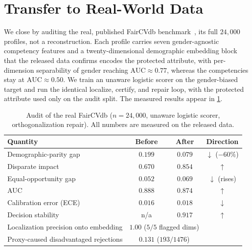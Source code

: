 \documentclass[sn-mathphys-num]{sn-jnl}
\begin{document}
\section{Transfer to Real-World Data}
\label{sec:transfer}
We close by auditing the real, published FairCVdb
benchmark~\cite{pena2020faircv,pena2023human}, its full $24{,}000$ profiles, not a
reconstruction. Each profile carries seven gender-agnostic competency features
and a twenty-dimensional demographic embedding block that the released data
confirms encodes the protected attribute, with per-dimension separability of
gender reaching $\mathrm{AUC}\approx0.77$, whereas the competencies stay at
$\mathrm{AUC}\approx0.50$. We train an unaware logistic scorer on the gender-biased
target and run the identical localize, certify, and repair loop, with the
protected attribute used only on the audit split. The measured results appear in
\cref{tab:real}.

\begin{table}[tbp]
\centering
\caption{Audit of the real FairCVdb ($n=24{,}000$, unaware logistic scorer,
orthogonalization repair). All numbers are measured on the released data.}
\label{tab:real}
\small
\begin{tabular}{lccc}
\toprule
Quantity & Before & After & Direction\\
\midrule
Demographic-parity gap & $0.199$ & $0.079$ & $\downarrow$ ($-60\%$)\\
Disparate impact & $0.670$ & $0.854$ & $\uparrow$\\
Equal-opportunity gap & $0.052$ & $0.069$ & $\downarrow$ (rises)\\
AUC & $0.888$ & $0.874$ & $\uparrow$\\
Calibration error (ECE) & $0.016$ & $0.018$ & $\downarrow$\\
Decision stability & n/a & $0.917$ & $\uparrow$\\
\midrule
Localization precision onto embedding & \multicolumn{2}{c}{$1.00$ ($5/5$ flagged dims)} & \\
Proxy-caused disadvantaged rejections & \multicolumn{2}{c}{$0.131$ ($193/1476$)} & \\
\bottomrule
\end{tabular}
\end{table}
\end{document}
